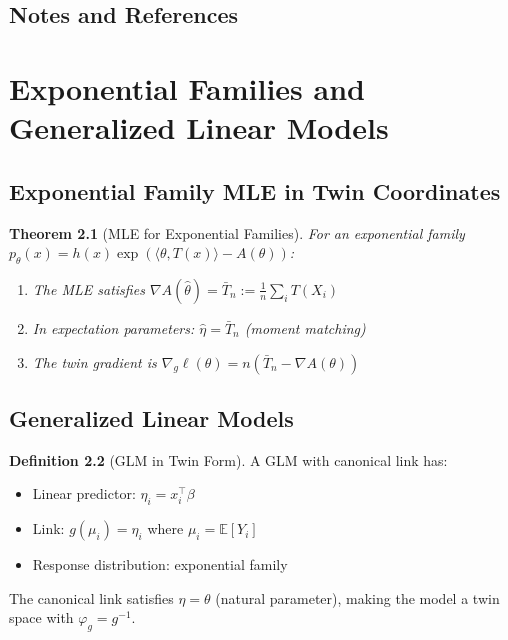 \documentclass[11pt,twoside]{book}
\theoremstyle{plain}
\newtheorem{theorem}{Theorem}[chapter]
\theoremstyle{definition}
\newtheorem{definition}[theorem]{Definition}
\theoremstyle{remark}
\newcommand{\E}{\mathbb{E}}
\newcommand{\nablg}{\nabla_g}
\begin{document}
\section{Notes and References}
\label{sec:ch6_notes}


\chapter{Exponential Families and Generalized Linear Models}
\label{ch:exp_families}

\section{Exponential Family MLE in Twin Coordinates}
\label{sec:exp_mle}

\begin{theorem}[MLE for Exponential Families]
    For an exponential family $p_\theta(x) = h(x) \exp(\langle \theta, T(x) \rangle - A(\theta))$:
    \begin{enumerate}
        \item The MLE satisfies $\nabla A(\hat{\theta}) = \bar{T}_n := \frac{1}{n}\sum_i T(X_i)$
        \item In expectation parameters: $\hat{\eta} = \bar{T}_n$ (moment matching)
        \item The twin gradient is $\nablg \ell(\theta) = n(\bar{T}_n - \nabla A(\theta))$
    \end{enumerate}
\end{theorem}

\section{Generalized Linear Models}
\label{sec:glm}

\begin{definition}[GLM in Twin Form]
    A GLM with canonical link has:
    \begin{itemize}
        \item Linear predictor: $\eta_i = x_i^\top \beta$
        \item Link: $g(\mu_i) = \eta_i$ where $\mu_i = \E[Y_i]$
        \item Response distribution: exponential family
    \end{itemize}
    The canonical link satisfies $\eta = \theta$ (natural parameter), making the model a twin space with $\varphi_g = g^{-1}$.
\end{definition}
\end{document}
